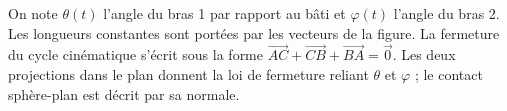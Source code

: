 \begin{corrigebox}
On note $\theta(t)$ l'angle du bras 1 par rapport au bâti et $\varphi(t)$
l'angle du bras 2. Les longueurs constantes sont portées par les vecteurs
de la figure. La fermeture du cycle cinématique s'écrit sous la forme
$\overrightarrow{AC}+\overrightarrow{CB}+\overrightarrow{BA}=\vec0$.
Les deux projections dans le plan donnent la loi de fermeture reliant
$\theta$ et $\varphi$ ; le contact sphère-plan est décrit par sa normale.
\end{corrigebox}
